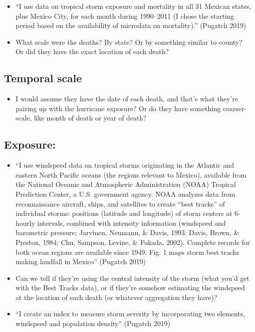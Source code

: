 \documentclass[
]{article}
\providecommand{\tightlist}{%
  \setlength{\itemsep}{0pt}\setlength{\parskip}{0pt}}
\begin{document}
\begin{itemize}
\tightlist
\item
  ``I use data on tropical storm exposure and mortality in all 31
  Mexican states, plus Mexico City, for each month during 1990--2011 (I
  chose the starting period based on the availability of microdata on
  mortality).'' (Pugatch 2019)
\item
  What scale were the deaths? By state? Or by something similar to
  county? Or did they have the exact location of each death?
\end{itemize}

\hypertarget{temporal-scale-11}{%
\subsection{Temporal scale}\label{temporal-scale-11}}

\begin{itemize}
\tightlist
\item
  I would assume they have the date of each death, and that's what
  they're pairing up with the hurricane exposure? Or do they have
  something coarser-scale, like month of death or year of death?
\end{itemize}

\hypertarget{exposure-10}{%
\subsection{Exposure:}\label{exposure-10}}

\begin{itemize}
\tightlist
\item
  ``I use windspeed data on tropical storms originating in the Atlantic
  and eastern North Pacific oceans (the regions relevant to Mexico),
  available from the National Oceanic and Atmospheric Administration
  (NOAA) Tropical Prediction Center, a U.S. government agency. NOAA
  analyzes data from reconnaissance aircraft, ships, and satellites to
  create ``best tracks'' of individual storms: positions (latitude and
  longitude) of storm centers at 6-hourly intervals, combined with
  intensity information (windspeed and barometric pressure; Jarvinen,
  Neumann, \& Davis, 1993; Davis, Brown, \& Preston, 1984; Chu, Sampson,
  Levine, \& Fukada, 2002). Complete records for both ocean regions are
  available since 1949. Fig. 1 maps storm best tracks making landfall in
  Mexico'' (Pugatch 2019)
\item
  Can we tell if they're using the central intensity of the storm (what
  you'd get with the Best Tracks data), or if they're somehow estimating
  the windspeed at the location of each death (or whatever aggregation
  they have)?
\item
  ``I create an index to measure storm severity by incorporating two
  elements, windspeed and population density'' (Pugatch 2019)
\end{itemize}
\end{document}
